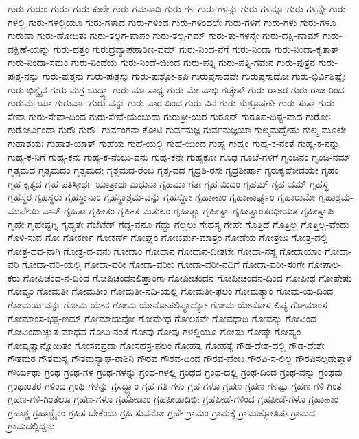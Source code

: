 {ಗುರು
ಗುರುಂ
ಗುರುಃ
ಗುರು-ಕುಲೇ
ಗುರು-ಗಮನಾದಿ
ಗುರು-ಗಳ
ಗುರು-ಗಳನ್ನು
ಗುರು-ಗಳನ್ನೂ
ಗುರು-ಗಳನ್ನೇ
ಗುರು-ಗಳಲ್ಲಿ
ಗುರು-ಗಳಲ್ಲಿಯೂ
ಗುರು-ಗಳಾದ
ಗುರು-ಗಳಿಂದ
ಗುರು-ಗಳಿಂದಲೇ
ಗುರು-ಗಳಿಗೆ
ಗುರು-ಗಳು
ಗುರು-ಗಳೂ
ಗುರುಣಾ
ಗುರು-ಣೋದಿತಃ
ಗುರು-ತಲ್ಪಗ-ಪಾಪಂ
ಗುರು-ತಲ್ಪ-ಗಮ್
ಗುರು-ತು-ಗಳನ್ನೇ
ಗುರು-ದಕ್ಷಿ-ಣಾಮ್
ಗುರು-ದಕ್ಷಿಣೆ-ಯನ್ನು
ಗುರು-ದತ್ತಂ
ಗುರುದ್ರವ್ಯಾಪಹಾರಿಣ-ವಮ್
ಗುರು-ನಿಂದ-ನೆಗೆ
ಗುರು-ನಿಂದಾ
ಗುರು-ನಿಂದಾ-ಕೃತಾತ್
ಗುರು-ನಿಂದಾ-ಸಮಂ
ಗುರು-ನಿಂದೆಯ
ಗುರು-ನಿಂದೆ-ಯಿಂದ
ಗುರು-ಪತ್ನಿ
ಗುರು-ಪತ್ನಿ-ಗಮನ
ಗುರು-ಪುತ್ರನ
ಗುರು-ಪುತ್ರ-ನನ್ನು
ಗುರು-ಪುತ್ರನು
ಗುರು-ಪುತ್ರಸ್ತು
ಗುರು-ಪುತ್ರೋ-ಽಪಿ
ಗುರುಪ್ರಸಾದವೇ
ಗುರುಪ್ರಸಾದೋ
ಗುರು-ಭಿರ್ವಿಶಿಷ್ಟೈಃ
ಗುರು-ಭಿಶ್ಚೈವ
ಗುರು-ಮಗ್ರ-ಬುದ್ಧ್ಯಾ
ಗುರು-ಮಾ-ಸಾಧ್ಯ
ಗುರು-ಮೇ-ವಾಭಿ-ಗಚ್ಛೇತ್
ಗುರು-ರಾಜರ
ಗುರು-ರಾಜ-ರಿಂದ
ಗುರುರ್ಮಯಾ
ಗುರುರ್ವಾ
ಗುರು-ವನ್ನು
ಗುರು-ವಾರ-ದಿಂದ
ಗುರು-ವಿನ
ಗುರು-ಶುಶ್ರೂಷಣೇ
ಗುರು-ಸುತಾ
ಗುರು-ಸೇವಾ
ಗುರು-ಸೇವಾ-ದಿಂದ
ಗುರು-ಸೇವೆ-ಯೆಂಬುದು
ಗುರುತ್ರೀ-ಯರ
ಗುರೂನ್
ಗುರೂಪ-ದಿಷ್ಟ-ವಾದ
ಗುರೋಃ
ಗುರೋರ್ವಿಂದಾ
ಗುರೌ
ಗುರೌ-
ಗುರ್ವಂಗನಾ-ಕೋಟಿ
ಗುರ್ವನುಜ್ಞ
ಗುರ್ವನುಜ್ಞಯಾ
ಗುಲ್ಮಮದ್ವೇಷು
ಗುಲ್ಮ-ಮೂಲೇ
ಗುಹಾಶಯಃ
ಗುಹಾಶ-ಯಾತ್
ಗುಹೆಯ
ಗುಹೆ-ಯಲ್ಲಿ
ಗುಹೆ-ಯಿಂದ
ಗುಹ್ಯ
ಗುಹ್ಯಂ
ಗುಹ್ಯ-ಕ-ನಂತೆ
ಗುಹ್ಯ-ಕ-ನನ್ನು
ಗುಹ್ಯ-ಕ-ನಿಗೆ
ಗುಹ್ಯ-ಕನು
ಗುಹ್ಯ-ಕ-ನೆಂಬು-ವನು
ಗುಹ್ಯ-ಕನೇ
ಗುಹ್ಯಕೋ
ಗೂಢ
ಗೂಬೆ-ಗಳಿಗೆ
ಗೃಂಜನಂ
ಗೃಂಜ-ನಮ್
ಗೃತ್ಸಮದ
ಗೃತ್ಸಮದಂ
ಗೃತ್ಸಮದಃ
ಗೃತ್ಸಮದ-ರೆಂಬ
ಗೃತ್ಸ-ವದ
ಗೃಧ್ರಶಿ-ರಸಃ
ಗೃಧ್ರಶೀರ್ಷಾ
ಗೃರುಕೃಪೋದಯೇ
ಗೃಹಂ
ಗೃಹ-ಕೃತ್ಯದ
ಗೃಹ-ಪತಿಸ್ತೀರ್ಥ-ಯಾತ್ರಾರ್ಥಮಧುನಾ
ಗೃಹಮಾ-ಗತಃ
ಗೃಹ-ಮಿದಂ
ಗೃಹಮ್
ಗೃಹ-ವಮ್
ಗೃಹಸ್ಥ
ಗೃಹಸ್ಥರ
ಗೃಹಸ್ಥರು
ಗೃಹಸ್ಥಾನಾಂ
ಗೃಹಸ್ಥಾಶ್ರಮ-ವನ್ನು
ಗೃಹಸ್ಥೋ
ಗೃಹಾಣಾಂ
ಗೃಹಾಣಾರ್ಘ್ಯಂ
ಗೃಹಾರಾಮೇ
ಗೃಹಾಶ್ರಮ-ಮುಪೇಯಿ-ವಾನ್
ಗೃಹಿತಾ
ಗೃಹೀತಂ
ಗೃಹೀತ-ಮತುಲಂ
ಗೃಹೀತ್ಯಾ
ಗೃಹೀತ್ವಾ
ಗೃಹೀತ್ವಾಂತರಧೀಯತ
ಗೃಹೀತ್ವಾಪಿ
ಗೃಹೇ
ಗೃಹೇಷ್ಟಗ್ನಿ
ಗೃಹ್ಯತೇ
ಗೆಜೆಟೆಡ್
ಗೆದ್ದ-ವನೂ
ಗೆದ್ದು
ಗೆಲ್ಲಲು
ಗೇಹಸ್ಯ
ಗೇಹೇ
ಗೊತ್ತಿದೆ
ಗೊತ್ತಿಲ್ಲ
ಗೊತ್ತಿಲ್ಲ-ವೆಂದು
ಗೊಳಿ-ಸುವ
ಗೋ
ಗೋಕರ್ಣ
ಗೋಕರ್ಣೆ
ಗೋಘ್ನಂ
ಗೋಚರ್ಮ-ಮಾತ್ರಂ
ಗೋಡೆಯ
ಗೋತ್ರಜಃ
ಗೋತ್ರ-ದಲ್ಲಿ
ಗೋತ್ರ-ದವ-ನಾಗಿ
ಗೋತ್ರ-ದ-ವನು
ಗೋದಾಂ
ಗೋದಾನ
ಗೋದಾನ-ದೀತಟೇ
ಗೋದಾ-ನಸ್ಯ
ಗೋದಾಯಾಂ
ಗೋದಾ-ವರಿ
ಗೋದಾ-ವರಿ-ಯಲ್ಲಿ
ಗೋದಾ-ವರೀ
ಗೋದಾ-ವರೀಂ
ಗೋದಾ-ವರೀ-ನದಿಗೆ
ಗೋದಾ-ವರೀ-ಸಂಗೇ
ಗೋಪಾಲ-ಕರು
ಗೋಪಿಚಂದ-ನ-ದಿಂದ
ಗೋಪಿಚಂದನಲಿಪ್ತಾಂಗಾ
ಗೋಪೀಚಂದನ
ಗೋಪೀಚಂದನ-ದಿಂದ
ಗೋಪೀಥ
ಗೋಪೇಷು
ಗೋಪ್ಯಂ
ಗೋಮತೀ
ಗೋಮತೀಂ
ಗೋಮತೀ-ನದಿ-ಯಲ್ಲಿ
ಗೋಮತೀ-ಫಲಂ
ಗೋಮತ್ಯಾಂ
ಗೋಮ-ಯ-ದಿಂದ
ಗೋಮಯ-ವನ್ನು
ಗೋಮ-ಯೇನ
ಗೋಮ-ಯೇನೋಪಲಿಪ್ಯಾದ್ಯೋ
ಗೋಮ-ಯೇನೋಸ-ಲಿಪ್ಯ
ಗೋಮಾಂಸ
ಗೋಮಾಂಸ-ಭಕ್ಷ-ಣಮ್
ಗೋಮಾಯವೋ
ಗೋಮೇಧ
ಗೋಲಕವೇ
ಗೋವಧಾದಿ
ಗೋವನ್ನು
ಗೋವಿಂದ
ಗೋವಿಂದಾಚ್ಯುತ-ಮಾಧವ
ಗೋವಿ-ನಂತೆ
ಗೋವು
ಗೋವು-ಗಳಲ್ಲಿಯೂ
ಗೋಷು
ಗೋಷ್ಠೇ
ಗೋಷ್ಯಂ
ಗೋಷ್ಯತ್ವಾನ್ನೋದಿತಂ
ಗೋಸವಪ್ರದಾ
ಗೋಸಹಸ್ರ-ಫಲಂ
ಗೋಹತ್ಯ
ಗೋಹತ್ಯೆ
ಗೌಡ-ದೇಶ-ದಲ್ಲಿ
ಗೌಡ-ದೇಶೇ
ಗೌತಮರ
ಗೌತಮಸ್ಯ
ಗೌತಮಸ್ಯಾಘ-ನಾಶಿನಿ
ಗೌರವ
ಗೌರವ-ದಿಂದ
ಗೌರವ-ವೆಂಬ
ಗೌರವಿ-ಸ-ಲಿಲ್ಲ
ಗೌರವಿಸಲ್ಪಡುತ್ತಾಳೆ
ಗೌರ್ಯಥಾ
ಗ್ರಂಥ
ಗ್ರಂಥ-ಗಳ
ಗ್ರಂಥ-ಗಳನ್ನು
ಗ್ರಂಥ-ಗಳಲ್ಲಿ
ಗ್ರಂಥದ
ಗ್ರಂಥ-ದಲ್ಲಿ
ಗ್ರಂಥ-ದಿಂದ
ಗ್ರಂಥ-ವನ್ನು
ಗ್ರಂಥವು
ಗ್ರಂಥಾಂತರ-ಗಳಿಂದ
ಗ್ರಂಥಿ-ಗಳನ್ನು
ಗ್ರಸದ್ಭ್ಯಾಂ
ಗ್ರಹ-ಗತಿ-ಗಳು
ಗ್ರಹ-ಗಳೂ
ಗ್ರಹಣ
ಗ್ರಹಣ-ಗಳಷ್ಟು
ಗ್ರಹಣ-ಗಳಿ-ಗಿಂತ
ಗ್ರಹಣ-ಗಳಿ-ಗಿಂತಲೂ
ಗ್ರಹಣ-ಗಳೂ
ಗ್ರಹಪೀಡಾಂ
ಗ್ರಹಪೀಡಾದಿಭಿಃ
ಗ್ರಹಪೀಡೆ-ಗಳಿಂದ
ಗ್ರಹಪೀಡೆ-ಗಳೂ
ಗ್ರಹಾಣಾಂ
ಗ್ರಹಾಶ್ಚ
ಗ್ರಹಾಶ್ಚೈನಂ
ಗ್ರಹಿಸ-ಬೇಕೆಂದು
ಗ್ರಹಿ-ಸುವನೋ
ಗ್ರಹೇ
ಗ್ರಾಮಂ
ಗ್ರಾಮಕ್ಕೆ
ಗ್ರಾಮಜ್ಯೋತಿಷಃ
ಗ್ರಾಮದ
ಗ್ರಾಮದಲ್ಲಿದ್ದನು
}
